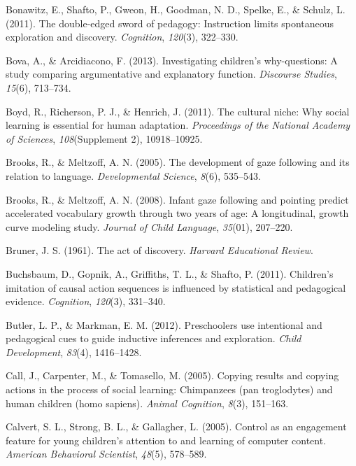 \documentclass[oneside]{report}
\begin{document}
\leavevmode\hypertarget{ref-bonawitz2011double}{}%
Bonawitz, E., Shafto, P., Gweon, H., Goodman, N. D., Spelke, E., \&
Schulz, L. (2011). The double-edged sword of pedagogy: Instruction
limits spontaneous exploration and discovery. \emph{Cognition},
\emph{120}(3), 322--330.

\leavevmode\hypertarget{ref-bova2013investigating}{}%
Bova, A., \& Arcidiacono, F. (2013). Investigating children's
why-questions: A study comparing argumentative and explanatory function.
\emph{Discourse Studies}, \emph{15}(6), 713--734.

\leavevmode\hypertarget{ref-boyd2011cultural}{}%
Boyd, R., Richerson, P. J., \& Henrich, J. (2011). The cultural niche:
Why social learning is essential for human adaptation. \emph{Proceedings
of the National Academy of Sciences}, \emph{108}(Supplement 2),
10918--10925.

\leavevmode\hypertarget{ref-brooks2005development}{}%
Brooks, R., \& Meltzoff, A. N. (2005). The development of gaze following
and its relation to language. \emph{Developmental Science}, \emph{8}(6),
535--543.

\leavevmode\hypertarget{ref-brooks2008infant}{}%
Brooks, R., \& Meltzoff, A. N. (2008). Infant gaze following and
pointing predict accelerated vocabulary growth through two years of age:
A longitudinal, growth curve modeling study. \emph{Journal of Child
Language}, \emph{35}(01), 207--220.

\leavevmode\hypertarget{ref-bruner1961act}{}%
Bruner, J. S. (1961). The act of discovery. \emph{Harvard Educational
Review}.

\leavevmode\hypertarget{ref-buchsbaum2011children}{}%
Buchsbaum, D., Gopnik, A., Griffiths, T. L., \& Shafto, P. (2011).
Children's imitation of causal action sequences is influenced by
statistical and pedagogical evidence. \emph{Cognition}, \emph{120}(3),
331--340.

\leavevmode\hypertarget{ref-butler2012preschoolers}{}%
Butler, L. P., \& Markman, E. M. (2012). Preschoolers use intentional
and pedagogical cues to guide inductive inferences and exploration.
\emph{Child Development}, \emph{83}(4), 1416--1428.

\leavevmode\hypertarget{ref-call2005copying}{}%
Call, J., Carpenter, M., \& Tomasello, M. (2005). Copying results and
copying actions in the process of social learning: Chimpanzees (pan
troglodytes) and human children (homo sapiens). \emph{Animal Cognition},
\emph{8}(3), 151--163.

\leavevmode\hypertarget{ref-calvert2005control}{}%
Calvert, S. L., Strong, B. L., \& Gallagher, L. (2005). Control as an
engagement feature for young children's attention to and learning of
computer content. \emph{American Behavioral Scientist}, \emph{48}(5),
578--589.
\end{document}
